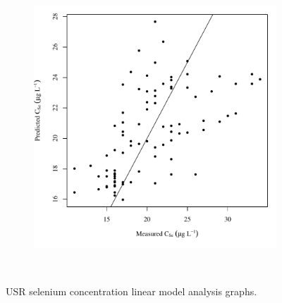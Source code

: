 \begin{linenumbers}
\begin{landscape}
\begin{figure}
\begin{subfigure}{0.7\textwidth}
			\includegraphics[width=\tableCustomSize]{"Figures/Results_USR/Stochastic/Conc Model pred v meas WTP"}
		\end{subfigure}\\
		\caption{USR selenium concentration linear model analysis graphs.}
	\end{figure}
\end{landscape}


\end{linenumbers}
